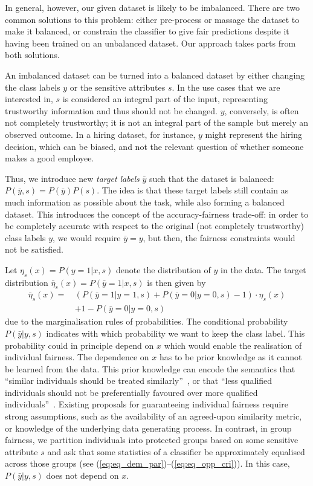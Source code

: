 In general, however, our given dataset is likely to be imbalanced.
There are two common solutions to this problem:
either pre-process or massage the dataset to make it balanced,
or constrain the classifier to give fair predictions despite it having been trained on an unbalanced dataset.
Our approach takes parts from both solutions.

An imbalanced dataset can be turned into a balanced dataset
by either changing the class labels $y$ or the sensitive attributes $s$.
In the use cases that we are interested in,
$s$ is considered an integral part of the input, representing trustworthy information and thus should not be changed.
$y$, conversely, is often not completely trustworthy; it is not an integral part of the sample but merely an observed outcome.
In a hiring dataset, for instance, $y$ might represent the hiring decision, which can be biased,
and not the relevant question of whether someone makes a good employee.

Thus, we introduce new \emph{target labels} $\bar{y}$
such that the dataset is balanced: $P(\bar{y}, s)=P(\bar{y})P(s)$.
The idea is that these target labels still contain as much information as possible about the task,
while also forming a balanced dataset.
This introduces the concept of the accuracy-fairness trade-off:
in order to be completely accurate with respect to the original (not completely trustworthy) class labels $y$, we would require $\bar{y} =y$,
but then, the fairness constraints would not be satisfied.

Let $\eta_s(x)=P(y=1|x, s)$ denote the distribution of $y$ in the data.
The target distribution $\bar{\eta}_s(x)=P(\bar{y}=1|x, s)$ is then given by
\begin{align}
  \bar{\eta}_s(x)=\, &(P(\bar{y}=1|y=1,s) + P(\bar{y}=0|y=0,s) - 1)\cdot\eta_s(x) \nonumber\\
  &+ 1 - P(\bar{y}=0|y=0,s)%
  \label{eq:etaeta}
\end{align}
due to the marginalisation rules of probabilities.
The conditional probability $P(\bar{y}|y,s)$ indicates with which probability we want to keep the class label.
This probability could in principle depend on $x$ which would enable the realisation of individual fairness.
The dependence on $x$ has to be prior knowledge as it cannot be learned from the data.
This prior knowledge can encode the semantics that ``similar individuals should be treated similarly''~\citep{dwork2012fairness},
or that ``less qualified individuals should not be preferentially favoured over more qualified individuals''~\citep{JosKeaMorRot16}.
Existing proposals for guaranteeing individual fairness require strong assumptions,
such as the availability of an agreed-upon similarity metric, or knowledge of the underlying data generating process.
%
In contrast, in group fairness, we partition individuals into protected groups based on some sensitive attribute $s$
and ask that some statistics of a classifier be approximately equalised across those groups (see (\ref{eq:eq_dem_par})--(\ref{eq:eq_opp_cri})). 
In this case, $P(\bar{y}|y,s)$ does not depend on $x$.

